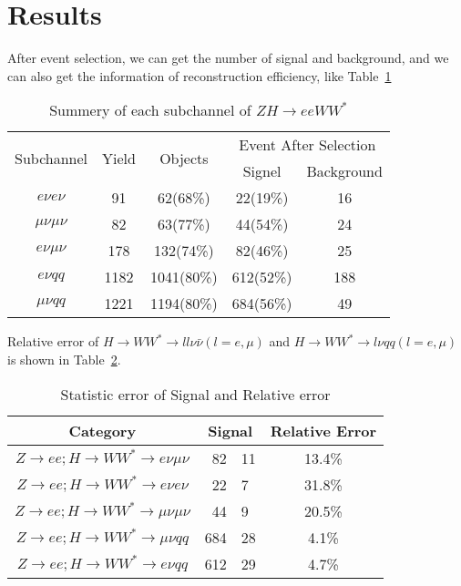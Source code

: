 \documentclass[11pt,a4paper]{cepcnote}
\begin{document}
%
%
\section{Results}
After event selection, we can get the number of signal and background, 
and we can also get the information of reconstruction efficiency, 
like Table~\ref{tab:efficiency}
\begin{table}[H]
  \begin{center}
    \begin{tabular}{|c|c|c|c|c|}
      \hline \hline
      \multirow{2}{*}{Subchannel}& \multirow{2}{*}{Yield}&\multirow{2}{*}{Objects}&\multicolumn{2}{c|}{Event After Selection}\\ 
	  \cline{4-5}
	  						&			&		& Signel&Background\\
      \hline
      $e\nu e\nu$ 	    	&   91		& 62(68\%)	&	22(19\%)	& 16\\
      $\mu\nu\mu\nu$		&   82		& 63(77\%)	&	44(54\%)	& 24\\
      $e\nu\mu\nu$    		&   178		& 132(74\%)	&	82(46\%)	& 25\\
	  $e\nu qq$   			&   1182 	& 1041(80\%)&	612(52\%)	& 188\\
	  $\mu\nu qq$			&	1221	& 1194(80\%)& 	684(56\%)	& 49\\
      \hline \hline
    \end{tabular}
  \caption[Monte Carlo purities in the single lepton sample]{%
    Summery of each subchannel of $ZH\rightarrow eeWW^*$}
  \label{tab:efficiency}
  \end{center}
\end{table}

Relative error of $H\rightarrow WW^*\rightarrow ll\nu\bar{\nu} (l = e,\mu)$ and 
$H\rightarrow WW^*\rightarrow l\nu qq (l = e,\mu)$ is shown in Table~\ref{tab:fullstatistic}.

\begin{table}[H]
  \begin{center}
    \begin{tabular}{cr@{$\pm$}lc}
      \hline \hline
      Category      &\multicolumn{2}{c}{Signal}& \multicolumn{1}{c}{Relative Error}\\ 
      \hline
      $Z\rightarrow ee; H\rightarrow WW^*\rightarrow e\nu\mu\nu		$	&82    &11	&13.4\% \\
      $Z\rightarrow ee; H\rightarrow WW^*\rightarrow e\nu e\nu		$	&22    &7	&31.8\%\\
      $Z\rightarrow ee; H\rightarrow WW^*\rightarrow \mu\nu\mu\nu	$	&44    &9	&20.5\%	\\ 
	  $Z\rightarrow ee; H\rightarrow WW^*\rightarrow \mu\nu qq		$	&684   &28	&4.1\%    \\
	  $Z\rightarrow ee; H\rightarrow WW^*\rightarrow e\nu qq		$	&612   &29	&4.7\%    \\
      \hline \hline
    \end{tabular}
  \caption{Statistic error of Signal and Relative error}
  \label{tab:fullstatistic}
  \end{center}
\end{table}
\end{document}

